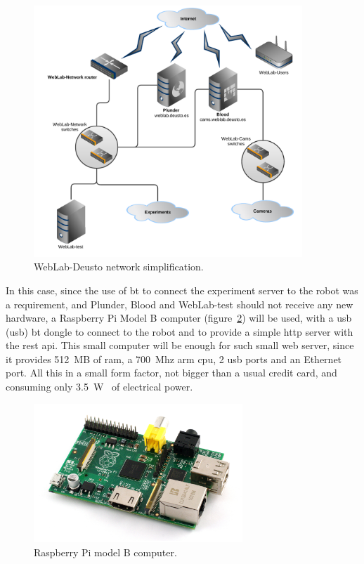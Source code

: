 \begin{figure}[!htbp]
	\centering
	\includegraphics[width=0.9\textwidth]{fig/weblab-network}
	\caption{WebLab-Deusto network simplification.}\label{fig:weblab-network}
\end{figure}

In this case, since the use of \acrlong{bt} to connect the experiment server to the robot was a
requirement, and Plunder, Blood and WebLab-test should not receive any new hardware, a Raspberry Pi
Model B computer (figure~\ref{fig:rasp}) will be used, with a \acrshort{usb} (\acrlong{usb})
\acrlong{bt} dongle to connect to the robot and to provide a simple \acrshort{http} server with the
\acrshort{rest} \acrshort{api}. This small computer will be enough for such small web server, since
it provides 512~MB of \acrshort{ram}, a 700~Mhz \acrshort{arm} \acrshort{cpu}, 2 \acrshort{usb}
ports and an Ethernet port. All this in a small form factor, not bigger than a usual credit card,
and consuming only 3.5~W~\cite{rasp_b} of electrical power.

\begin{figure}[!htbp]
	\centering
	\includegraphics[width=0.7\textwidth]{fig/rasp.jpg}
	\caption{Raspberry Pi model B computer.}
	\label{fig:rasp}
\end{figure}


